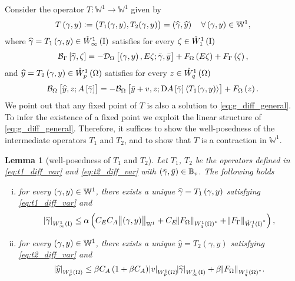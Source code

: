 \documentclass[final]{siamltex}
\newtheorem{lem}[theorem]{Lemma}
\begin{document}
Consider the operator $T:{\mathbb{W}}^1 \to {\mathbb{W}}^1$ given by
	\begin{equation}\label{eq:T_diff_oper}
		T\del{\gamma, y} := \del{T_1(\gamma,y), T_2(\gamma, y)} = \del{{\widehat \gamma}, {\widehat y}}
			\quad \forall \del{\gamma, y} \in {\mathbb{W}}^1,
	\end{equation}
where ${\widehat \gamma} = T_1\del{\gamma, y} \in {{\mathring{W}^{1}_{\infty}\del{{\text{\rm I}}}}}$ satisfies for every $\zeta \in {{\mathring{W}^{{1}}_{{1}}\del{{\text{\rm I}}}}}$
	\begin{equation}\label{eq:t1_diff_var}
		{{\mathcal{B}}_\Gamma}\sbr{{\widehat \gamma},\zeta} = 
			- {{\mathcal{D}}_\Omega}\sbr{\del{\gamma, y}, E\zeta; {\bar{\gamma}},{\bar{y}}}
			 + F_\Omega\del{E\zeta} + F_\Gamma\del\zeta,
	\end{equation}
and ${\widehat y} = T_2\del{\gamma,y} \in {{\mathring{W}^{1}_{p}\del{\Omega}}}$ satisfies for every $z \in {{\mathring{W}^{{1}}_{{q}}\del{{\Omega}}}}$
	\begin{align}\label{eq:t2_diff_var}
		{{\mathcal{B}}_\Omega}\sbr{{\widehat y}, z; A\sbr{\bar{\gamma}}} = 
			- {{\mathcal{B}}_\Omega}\sbr{{\bar{y}} + v, z; \Dif A\sbr{\bar{\gamma}}{\langle {T_1(\gamma, y)} \rangle}} + 
			F_\Omega\del z.
	\end{align}
We point out that any fixed point of $T$ is also a solution to \eqref{eq:g_diff_general}. To infer the existence of a fixed point we exploit the linear structure of \eqref{eq:g_diff_general}. Therefore, it suffices to show the well-posedness of the intermediate operators $T_1$ and $T_2$, and to show that $T$ is a contraction in ${\mathbb{W}}^1$. 
\begin{lem}[well-posedness of $T_1$ and $T_2$] \label{lem:t_diff_maps_back}
Let $T_1$, $T_2$ be the operators defined in \eqref{eq:t1_diff_var} and \eqref{eq:t2_diff_var} with
$\del{{\bar{\gamma}},{\bar{y}}} \in {\mathbb{B}}_v$. The following holds
\begin{enumerate}[(i)]
	\item\label{item:t_diff_maps_back_b} for every $\del{\gamma,y} \in {\mathbb{W}}^1$, there exists a unique ${\widehat \gamma} = T_1\del{\gamma,y}$ satisfying \eqref{eq:t1_diff_var} and   
         \[
              {\abs{\widehat \gamma}_{{W^{{{1}}}_{{{\infty}}}\del{{\text{\rm I}}}}}} 
              	\leq \alpha\del{C_EC_A\norm{\del{\gamma,y}}_{{\mathbb{W}}^1}
			+ C_E{\norm{{F_\Omega}}_{{{W^{{{1}}}_{{q}}\del{{\Omega}}}}^*}}
              		+ {\norm{{F_\Gamma}}_{{{\mathring{W}^{{{1}}}_{{{1}}}\del{{{\text{\rm I}}}}}}^*}}},
         \]
	\item\label{item:t_diff_maps_back_a} for every $\del{\gamma, y} \in {\mathbb{W}}^1$, there exists a unique ${\widehat y} = T_2(\gamma, y)$ satisfying 
               \eqref{eq:t2_diff_var} and  
         \[ 
            {\abs{\widehat y}_{{W^{{{1}}}_{{{p}}}\del{{{\Omega}}}}}} \leq
            	\beta C_A \del{1+\beta C_A}{\abs{{v}}_{{W^{{1}}_{{p}}\del{{\Omega}}}}}{\abs{\widehat \gamma}_{{W^{{{1}}}_{{{\infty}}}\del{{\text{\rm I}}}}}} 
	 				+\beta {\norm{{F_\Omega}}_{{{W^{{1}}_{{q}}\del{{\Omega}}}}^*}}.
         \]   
\end{enumerate}
\end{lem}
\end{document}
